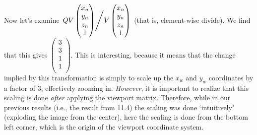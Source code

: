 \documentclass[11pt]{tingpset}
\begin{document}
    Now let's examine
    $\left.
    QV \begin{pmatrix}
      x_n \\
      y_n \\
      z_n \\
      1
    \end{pmatrix}
    \middle/
    V \begin{pmatrix}
        x_n \\
        y_n \\
        z_n \\
        1
    \end{pmatrix}
    \right.
    $ (that is, element-wise divide). We find that this gives
    $
      \begin{pmatrix}
        3 \\
        3 \\
        1 \\
        1 \\
      \end{pmatrix}
    $. This is interesting, because it means that the change implied by this transformation is simply to scale up the $x_w$ and $y_w$ coordinates by a factor of 3, effectively zooming in. \emph{However}, it is important to realize that this scaling is done \emph{after} applying the viewport matrix. Therefore, while in our previous results (i.e., the result from 11.4) the scaling was done `intuitively' (exploding the image from the center), here the scaling is done from the bottom left corner, which is the origin of the viewport coordinate system.
\end{document}
